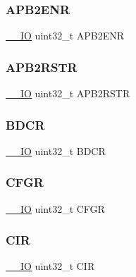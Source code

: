 \subsubsection{\texorpdfstring{APB2ENR}{APB2ENR}}
{\footnotesize\ttfamily \mbox{\hyperlink{core__sc300_8h_aec43007d9998a0a0e01faede4133d6be}{\+\_\+\+\_\+\+IO}} uint32\+\_\+t A\+P\+B2\+E\+NR}

\mbox{\label{struct_r_c_c___type_def_ab2c5389c9ff4ac188cd498b8f7170968}} 
\subsubsection{\texorpdfstring{APB2RSTR}{APB2RSTR}}
{\footnotesize\ttfamily \mbox{\hyperlink{core__sc300_8h_aec43007d9998a0a0e01faede4133d6be}{\+\_\+\+\_\+\+IO}} uint32\+\_\+t A\+P\+B2\+R\+S\+TR}

\mbox{\label{struct_r_c_c___type_def_a0b9a3ced775287c8585a6a61af4b40e9}} 
\subsubsection{\texorpdfstring{BDCR}{BDCR}}
{\footnotesize\ttfamily \mbox{\hyperlink{core__sc300_8h_aec43007d9998a0a0e01faede4133d6be}{\+\_\+\+\_\+\+IO}} uint32\+\_\+t B\+D\+CR}

\mbox{\label{struct_r_c_c___type_def_a26f1e746ccbf9c9f67e7c60e61085ec1}} 
\subsubsection{\texorpdfstring{CFGR}{CFGR}}
{\footnotesize\ttfamily \mbox{\hyperlink{core__sc300_8h_aec43007d9998a0a0e01faede4133d6be}{\+\_\+\+\_\+\+IO}} uint32\+\_\+t C\+F\+GR}

\mbox{\label{struct_r_c_c___type_def_a907d8154c80b7e385478943f90b17a3b}} 
\subsubsection{\texorpdfstring{CIR}{CIR}}
{\footnotesize\ttfamily \mbox{\hyperlink{core__sc300_8h_aec43007d9998a0a0e01faede4133d6be}{\+\_\+\+\_\+\+IO}} uint32\+\_\+t C\+IR}

